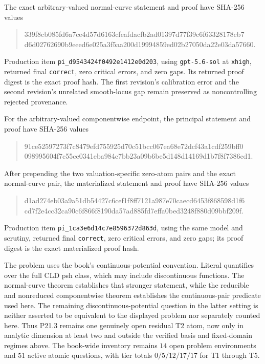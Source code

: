 The exact arbitrary-valued normal-curve statement and proof have SHA-256
values
\begin{quote}
\small\ttfamily
339f8cb085fd6a7ce4d57d6163cfeafdacfb2ad01397d77f39c6f63328178cb7\\
d6d02762690b9eeed6e025a3f5aa200d19994859ed02b27050da22e03da57660.
\end{quote}
Production item \texttt{pi\_d9543424f0492e1412e0d203}, using
\texttt{gpt-5.6-sol} at \texttt{xhigh}, returned final
\texttt{correct}, zero critical errors, and zero gaps.  Its returned proof
digest is the exact proof hash.  The first revision's calibration error and
the second revision's unrelated smooth-locus gap remain preserved as
noncontrolling rejected provenance.

For the arbitrary-valued componentwise endpoint, the principal statement and
proof have SHA-256 values
\begin{quote}
\small\ttfamily
91ce52597273f7c8479efd755925d70c51bcc067ea68e72dcf43a1cdf259bff0\\
098995604f7c55ce0341eba984c7bb23a09b6be5d148d14169d1b7f8f7386cd1.
\end{quote}
After prepending the two valuation-specific zero-atom pairs and the exact
normal-curve pair, the materialized statement and proof have SHA-256 values
\begin{quote}
\small\ttfamily
d1ad274eb03a9a51db54427c6cef1f8ff7121a987e70caecd6453f868598d1f6\\
cd7f2e4cc32ca90c6f866f8190da57ad885fd7effa0bed3248f880d09bbf209f.
\end{quote}
Production item \texttt{pi\_1ca3e6d14c7e8596372d863d}, using the same
model and scrutiny, returned final \texttt{correct}, zero critical errors,
and zero gaps; its proof digest is the exact materialized proof hash.

The problem uses the book's continuous-potential convention.  Literal
\cite[Definition~8.6.2]{CLD25} quantifies over the full CLD psh class, which
may include discontinuous functions.  The normal-curve theorem establishes
that stronger statement, while the reducible and nonreduced componentwise
theorem establishes the continuous-pair predicate used here.  The remaining
discontinuous-potential question in the latter setting is neither asserted to
be equivalent to the displayed problem nor separately counted here.  Thus
P21.3 remains one genuinely open residual T2 atom, now only in analytic
dimension at least two and outside the verified basis and fixed-domain
regimes above.  The book-wide inventory remains
\(14\) open problem environments and \(51\) active atomic questions, with
tier totals \(0/5/12/17/17\) for T1 through T5.

